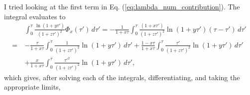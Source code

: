 \documentclass[11pt]{article}
\begin{document}
I tried looking at the first term in Eq. (\ref{eq:lambda_num_contribution}). The integral evaluates to 
\begin{align}\label{eq:log_phi_int}
    \quad& \int_0^{\tau} \frac{\ln(1+y\tau')}{(1+z\tau')^2} \Phi_x(\tau') \,d\tau' 
    = -\frac{1}{1+x\tau} \int_0^{\tau} \frac{(1+x\tau')}{(1+z\tau')^2} \ln(1+y\tau')(\tau-\tau') \,d\tau' \\\nonumber
    =& -\frac{\tau}{1+x\tau}\int_0^{\tau} \frac{1}{(1+z\tau')^2} \ln(1+y\tau')\,d\tau' 
    + \frac{1-x\tau}{1+x\tau}\int_0^{\tau} \frac{\tau'}{(1+z\tau')^2} \ln(1+y\tau')\,d\tau' \\\nonumber
    &+ \frac{x}{1+x\tau}\int_0^{\tau} \frac{\tau'^2}{(1+z\tau')^2} \ln(1+y\tau')\,d\tau', %
\end{align}
which gives, after solving each of the integrals, differentiating, and taking the appropriate limits,
\end{document}
